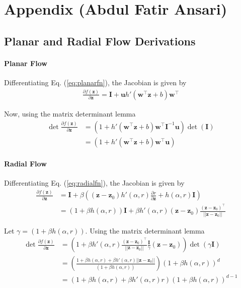 \documentclass[runningheads]{llncs}
\begin{document}
\section{Appendix (Abdul Fatir Ansari)}

\subsection{Planar and Radial Flow Derivations}

\paragraph{Planar Flow} Differentiating Eq. (\ref{eq:planarfn}), the Jacobian is given by
\begin{align*}
\frac{\partial f(\mathbf{z})}{\partial \mathbf{z}} = \mathbf{I} + \mathbf{u}h'(\mathbf{w}^\top\mathbf{z} + b)\mathbf{w}^\top
\end{align*}

Now, using the matrix determinant lemma
\begin{align}
\det\frac{\partial f(\mathbf{z})}{\partial \mathbf{z}} &= (1 + h'(\mathbf{w}^\top\mathbf{z} + b)\mathbf{w}^\top\mathbf{I}^{-1}\mathbf{u})\det(\mathbf{I})\\
&=(1 + h'(\mathbf{w}^\top\mathbf{z} + b)\mathbf{w}^\top\mathbf{u})\label{eq:planar-det}
\end{align}
\paragraph{Radial Flow} Differentiating Eq. (\ref{eq:radialfn}), the Jacobian is given by
\begin{align*}
\frac{\partial f(\mathbf{z})}{\partial \mathbf{z}} &= \mathbf{I} + \beta\left((\mathbf{z}-\mathbf{z}_0)h'(\alpha,r)\frac{\partial r}{\partial \mathbf{z}} + h(\alpha,r)\mathbf{I}\right)\\
&=(1+\beta h(\alpha,r))\mathbf{I} + \beta h'(\alpha,r)(\mathbf{z}-\mathbf{z}_0)\frac{(\mathbf{z}-\mathbf{z}_0)^\top}{||\mathbf{z}-\mathbf{z}_0||}
\end{align*}

Let $\gamma = (1+\beta h(\alpha,r))$. Using the matrix determinant lemma
\begin{align}
\det\frac{\partial f(\mathbf{z})}{\partial \mathbf{z}} &= \left(1 + \beta h'(\alpha,r)\frac{(\mathbf{z}-\mathbf{z}_0)^\top}{||\mathbf{z}-\mathbf{z}_0||}\frac{\mathbf{I}}{\gamma}(\mathbf{z}-\mathbf{z}_0)\right)\det(\gamma\mathbf{I})\\
&=\left(\frac{1 + \beta h(\alpha,r) + \beta h'(\alpha,r)||\mathbf{z}-\mathbf{z}_0||}{(1+\beta h(\alpha,r))}\right)(1+\beta h(\alpha,r))^d\\
&=\left(1 + \beta h(\alpha,r) + \beta h'(\alpha,r)r\right)(1+\beta h(\alpha,r))^{d-1}\label{eq:radial-det}
\end{align}
\end{document}
